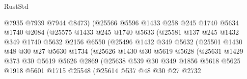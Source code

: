 \begin{lexlean}{RustStd}
\begin{coremodule}
                          @7935
                          @7939
                          @7944
                          @8473)
                        (@25566
                          @5596
                          @1433
                          @258
                          @245
                          @1740
                          @5634
                          @1740
                          @2084
                          (@25575
                            @1433
                            @245
                            @1740
                            @5633
                            (@25581
                              @137
                              @245
                              @1432
                              @349
                              @1740
                              @5632
                              @2156
                              @6550
                              (@25496
                                @1432
                                @349
                                @5632
                                (@25501
                                  @1430
                                  @48
                                  @30
                                  @27
                                  @5630
                                  @1734
                                  (@25626
                                    @1430
                                    @30
                                    @5619
                                    @5628
                                    (@25631
                                      @1429
                                      @373
                                      @30
                                      @5619
                                      @5626
                                      @2869
                                      (@25638
                                        @539
                                        @30
                                        @349
                                        @1856
                                        @5618
                                        @5625
                                        @1918
                                        @5601
                                        @1715
                                        @25548
                                        (@25614
                                          @537
                                          @48
                                          @30
                                          @27
                                          @2732

\end{coremodule}
\end{lexlean}
